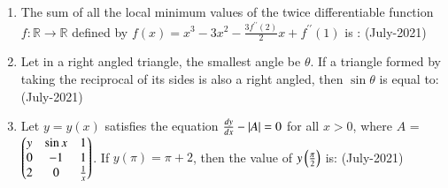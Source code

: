 \documentclass[journal]{IEEEtran}
\begin{document}
\begin{enumerate}
 \begin{enumerate}
 \end{enumerate}
    \item The sum of all the local minimum values of the twice differentiable function $f : \mathbb{R}\to
 \mathbb{R}$ defined by  $f(x) = x^3 - 3x^2 - \frac{3f^{\prime \prime}(2)}{2}x + f^{\prime\prime}(1)$ is : \hfill (July-2021)
 \begin{enumerate}
 \end{enumerate}
  \item Let in a right angled triangle, the smallest angle be $\theta$. If a triangle formed by taking the reciprocal of its sides is also a right angled, then $\sin \theta$ is equal to: \hfill (July-2021)
 \begin{enumerate}
 \end{enumerate}
  \item Let $y = y(x)$ satisfies the equation $\frac{dy}{dx} - \left\vert A\right\vert = 0$ for all $x > 0$, where $A$ = $\begin{pmatrix}y & \sin x & 1 \\ 0 & -1 & 1 \\ 2 & 0 & \frac{1}{x}\end{pmatrix}$. If $y(\pi) = \pi + 2$, then the value of $y\left(\frac{\pi}{2}\right)$ is: \hfill (July-2021)
 \begin{enumerate}
 \begin{multicols}{4}

\end{multicols}
\end{enumerate}
\end{enumerate}
\end{document}
